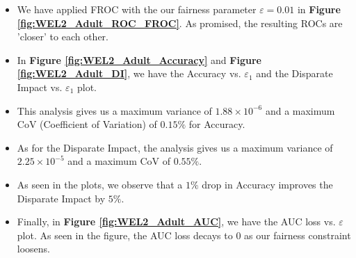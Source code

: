 \documentclass{article}
\newcommand{\ouralgo}{\texttt{FROC}}
\begin{document}
        



\begin{itemize}
    \item We have applied FROC with the our fairness parameter $\varepsilon = 0.01$ in \textbf{Figure \ref{fig:WEL2_Adult_ROC_FROC}}. As promised, the resulting ROCs are 'closer' to each other.
    \item In \textbf{Figure \ref{fig:WEL2_Adult_Accuracy}} and \textbf{Figure \ref{fig:WEL2_Adult_DI}}, we have the Accuracy vs. $\varepsilon_1$ and the Disparate Impact vs. $\varepsilon_1$ plot.
    \item This analysis gives us a maximum variance of $1.88\times10^{-6}$ and a maximum CoV (Coefficient of Variation) of $0.15\%$ for Accuracy.
    \item As for the Disparate Impact, the analysis gives us a maximum variance of $2.25\times10^{-5}$ and a maximum CoV of $0.55\%$.
    \item As seen in the plots, we observe that a $1\%$ drop in Accuracy improves the Disparate Impact by $5\%$.
    \item Finally, in \textbf{Figure \ref{fig:WEL2_Adult_AUC}}, we have the AUC loss vs. $\varepsilon$ plot. As seen in the figure, the AUC loss decays to $0$ as our fairness constraint loosens.
\end{itemize}




        
\end{document}
